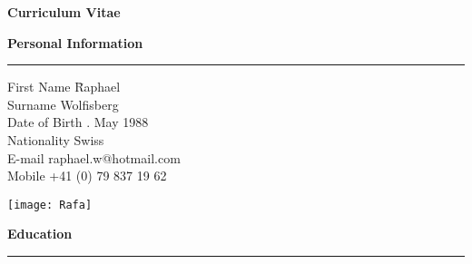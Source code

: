 


\graphicspath{{./Pictures/}}





\newpage
\pagestyle{plain}
\vspace{-9cm}

\huge
\textbf{Curriculum Vitae}

\bigskip
\bigskip
\large
\textbf{Personal Information}
\noindent\rule[3mm]{\linewidth}{1pt}

\normalsize
\vspace{-0.25cm}
\begin{tabbing}
First Name \hspace*{2.4cm} \= Raphael \\
Surname \> Wolfisberg \\
Date of Birth . May 1988 \\
Nationality \> Swiss \\
\medskip
E-mail \> raphael.w@hotmail.com \\
Mobile \> +41 (0) 79 837 19 62 
\end{tabbing}

\begin{addmargin}{0.03\textwidth}
\vspace{-4.1 cm}
\begin{flushright}
\texttt{[image: Rafa]} \\[1cm]
\end{flushright}
\end{addmargin}


\vspace{-0.7cm}
\large
\textbf{Education}
\noindent\rule[3mm]{\linewidth}{1pt}

